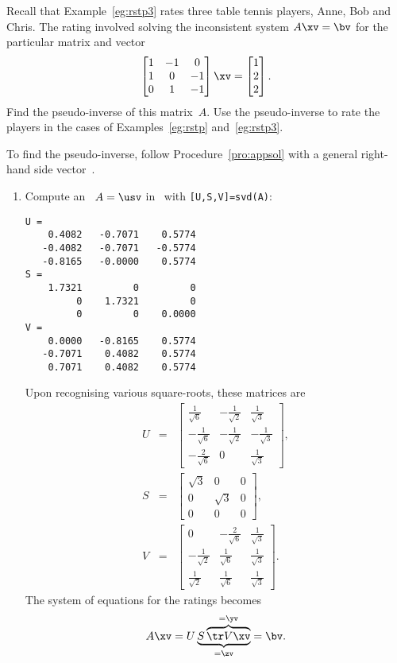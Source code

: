 \begin{example} \label{ex:} 
Recall that Example~\ref{eg:rstp3} rates three table tennis players, Anne, Bob and Chris.  
The rating involved solving the inconsistent system \(A\xv=\bv\) for the particular matrix and vector
\begin{equation*}
\begin{bmatrix} 1&-1&0\\1&0&-1\\0&1&-1 \end{bmatrix}\xv
=\begin{bmatrix} 1\\2\\2 \end{bmatrix}.
\end{equation*}
Find the pseudo-inverse of this matrix~\(A\).
Use the pseudo-inverse to rate the players in the cases of Examples~\ref{eg:rstp} and~\ref{eg:rstp3}.
\begin{solution} 
To find the pseudo-inverse, follow Procedure~\ref{pro:appsol} with a general right-hand side vector~\bv.
\begin{enumerate}
\item Compute an \svd\ \(A=\usv\) in \script\ with \verb|[U,S,V]=svd(A)|:
\begin{verbatim}
U =
    0.4082   -0.7071    0.5774
   -0.4082   -0.7071   -0.5774
   -0.8165   -0.0000    0.5774
S =
    1.7321         0         0
         0    1.7321         0
         0         0    0.0000
V =
    0.0000   -0.8165    0.5774
   -0.7071    0.4082    0.5774
    0.7071    0.4082    0.5774
\end{verbatim}
Upon recognising various square-roots, these matrices are
\begin{eqnarray*}
U&=&\begin{bmatrix} \frac1{\sqrt6}&-\frac1{\sqrt2}&\frac1{\sqrt3}
\\-\frac1{\sqrt6}&-\frac1{\sqrt2}&-\frac1{\sqrt3}
\\-\frac2{\sqrt6}&0&\frac1{\sqrt3} \end{bmatrix},
\\
S&=&\begin{bmatrix} \sqrt3&0&0
\\0&\sqrt3&0
\\0&0&0 \end{bmatrix},
\\
V&=&\begin{bmatrix} 0&-\frac2{\sqrt6}&\frac1{\sqrt3}
\\-\frac1{\sqrt2}&\frac1{\sqrt6}&\frac1{\sqrt3}
\\\frac1{\sqrt2}&\frac1{\sqrt6}&\frac1{\sqrt3} \end{bmatrix}.
\end{eqnarray*}
The system of equations for the ratings becomes
\begin{equation*}
A\xv=
U\underbrace{S\overbrace{\tr V\xv}^{=\yv}}_{=\zv}
=\bv.
\end{equation*}


\end{enumerate}
\end{solution}
\end{example}
